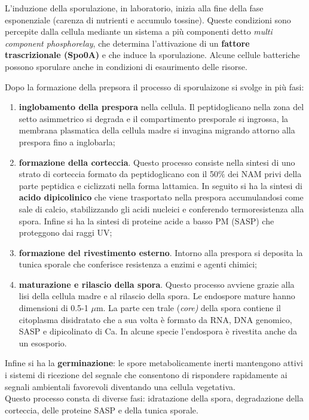 \documentclass[11pt]{book}
\begin{document}
L'induzione della sporulazione, in laboratorio, inizia alla fine della fase esponenziale (carenza di nutrienti e accumulo tossine).
Queste condizioni sono percepite dalla cellula mediante un sistema a più componenti detto \emph{multi component phosphorelay}, che determina l’attivazione di un \textbf{fattore trascrizionale (Spo0A)} e che induce la sporulazione.
Alcune cellule batteriche possono sporulare anche in condizioni di esaurimento delle risorse.

\vspace{1em}
Dopo la formazione della prepsora il processo di sporulaizone si svolge in più fasi:
\begin{enumerate}
\item \textbf{inglobamento della prespora} nella cellula. Il peptidoglicano nella zona del setto asimmetrico si degrada e il compartimento presporale si ingrossa, la membrana plasmatica della cellula madre si invagina migrando attorno alla prespora fino a inglobarla;
\item \textbf{formazione della corteccia}. Questo processo consiste nella sintesi di uno strato di corteccia formato da peptidoglicano con il 50$\%$  dei NAM privi della parte peptidica e ciclizzati nella forma lattamica. In seguito si ha la sintesi di \textbf{acido dipicolinico} che viene trasportato nella prespora accumulandosi come sale di calcio, stabilizzando gli acidi nucleici e conferendo termoresistenza alla spora. Infine si ha la sintesi di proteine acide a basso PM (SASP) che proteggono dai raggi UV;
\item \textbf{formazione del rivestimento esterno}. Intorno alla prespora si deposita la tunica sporale che conferisce resistenza a enzimi e agenti chimici;
\item \textbf{maturazione e rilascio della spora}. Questo processo avviene grazie alla lisi della cellula madre e al rilascio della spora. Le endospore mature hanno dimensioni di 0.5-1 $\mu$m. La parte cen trale (\emph{core)} della spora contiene il citoplasma disidratato che a sua volta è formato da RNA, DNA genomico, SASP e dipicolinato di Ca. In alcune specie l’endospora è rivestita anche da un esosporio.
\end{enumerate}


Infine si ha la \textbf{germinazione}: le spore metabolicamente inerti mantengono attivi i sistemi di ricezione del segnale che consentono di rispondere rapidamente ai segnali ambientali favorevoli diventando una cellula vegetativa.\\
Questo processo consta di diverse fasi: idratazione della spora, degradazione della corteccia, delle proteine SASP e della tunica sporale.
\end{document}
